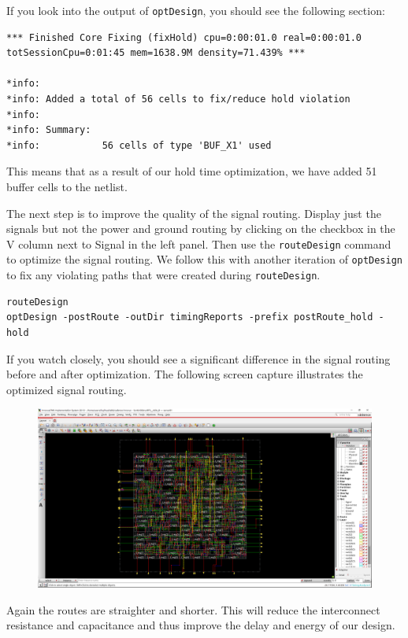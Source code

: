 \documentclass[a4paper,12pt,twoside]{article}
\begin{document}
If you look into the output of \texttt{optDesign}, you should see the following section:
\begin{verbatim}
*** Finished Core Fixing (fixHold) cpu=0:00:01.0 real=0:00:01.0 totSessionCpu=0:01:45 mem=1638.9M density=71.439% ***

*info:
*info: Added a total of 56 cells to fix/reduce hold violation
*info:
*info: Summary:
*info:           56 cells of type 'BUF_X1' used
\end{verbatim}
This means that as a result of our hold time optimization, we have added 51 buffer cells to the netlist.

The next step is to improve the quality of the signal routing. Display just the signals but not the power and ground routing by clicking on the checkbox in the V column next to Signal in the left panel. Then use the \texttt{routeDesign} command to optimize the signal routing. We follow this with another iteration of \texttt{optDesign} to fix any violating paths that were created during \texttt{routeDesign}.
\begin{verbatim}
routeDesign
optDesign -postRoute -outDir timingReports -prefix postRoute_hold -hold
\end{verbatim}
If you watch closely, you should see a significant difference in the signal routing before and after optimization. The following screen capture illustrates the optimized signal routing.
\begin{figure}[H]
    \centering
    \includegraphics[width=\textwidth]{images/17.png}
\end{figure}
Again the routes are straighter and shorter. This will reduce the interconnect resistance and capacitance and thus improve the delay and energy of our design.
\end{document}
